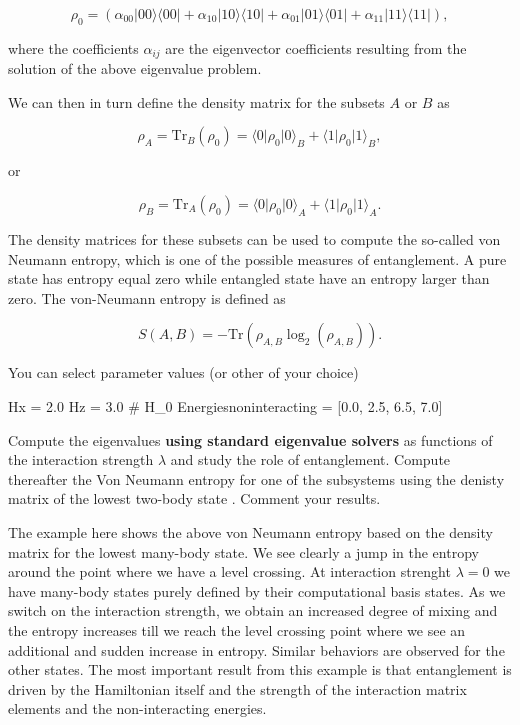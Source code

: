 \documentclass[%
oneside,                 %
final,                   %
10pt]{article}
\begin{document}
\[
\rho_0=\left(\alpha_{00}\vert 00 \rangle\langle 00\vert+\alpha_{10}\vert 10 \rangle\langle 10\vert+\alpha_{01}\vert 01 \rangle\langle 01\vert+\alpha_{11}\vert 11 \rangle\langle 11\vert\right),
\]

where the coefficients $\alpha_{ij}$ are the eigenvector coefficients
resulting from the solution of the above eigenvalue problem.

We can
then in turn define the density matrix for the subsets $A$ or $B$ as

\[
\rho_A=\mathrm{Tr}_B(\rho_{0})=\langle 0 \vert \rho_{0} \vert 0\rangle_{B}+\langle 1 \vert \rho_{0} \vert 1\rangle_{B},
\]

or

\[
\rho_B=\mathrm{Tr}_A(\rho_0)=\langle 0 \vert \rho_{0} \vert 0\rangle_{A}+\langle 1 \vert \rho_{0} \vert 1\rangle_{A}.
\]

The density matrices for these subsets can be used to compute the
so-called von Neumann entropy, which is one of the possible measures
of entanglement. A pure state has entropy equal zero while entangled
state have an entropy larger than zero. The von-Neumann entropy is
defined as

\[
S(A,B)=-\mathrm{Tr}\left(\rho_{A,B}\log_2 (\rho_{A,B})\right).
\]

You can select parameter values (or other of your choice)





\bpycod
Hx = 2.0
Hz = 3.0
# H_0
Energiesnoninteracting = [0.0, 2.5, 6.5, 7.0]

\epycod


Compute the eigenvalues \textbf{using standard eigenvalue solvers} as functions of
the interaction strength $\lambda$ and study the role of entanglement.
Compute thereafter the Von Neumann entropy for one of the subsystems using the denisty matrix  of the lowest
two-body state . Comment your results.

The example here shows the above von Neumann entropy based on the
density matrix for the lowest many-body state. We see clearly a jump
in the entropy around the point where we have a level crossing. At
interaction strenght $\lambda=0$ we have many-body states purely
defined by their computational basis states. As we switch on the
interaction strength, we obtain an increased degree of mixing and the
entropy increases till we reach the level crossing point where we see
an additional and sudden increase in entropy. Similar behaviors are
observed for the other states. The most important result from this
example is that entanglement is driven by the Hamiltonian itself and
the strength of the interaction matrix elements and the
non-interacting energies.
\end{document}
